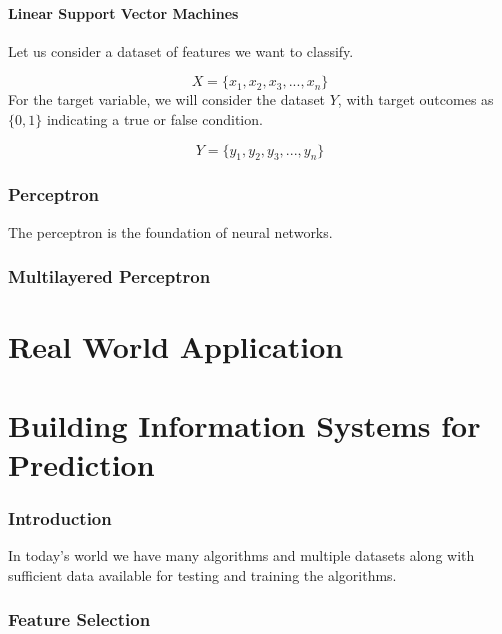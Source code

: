 \documentclass[12pt]{article}
\begin{document}
\subsection{Linear Support Vector Machines}
Let us consider a dataset of features we want to classify.

$$
X = \lbrace x_{1}, x_{2}, x_{3}, ... , x_{n} \rbrace 
$$ For the target variable, we will consider the dataset $Y$, with target outcomes as $\lbrace0,1\rbrace$ indicating a true or false condition.

$$
Y = \lbrace y_{1}, y_{2}, y_{3}, ... , y_{n} \rbrace 
$$

\newpage
\section{Perceptron}
The perceptron is the foundation of neural networks.

\newpage
\section{Multilayered Perceptron}

\newpage
\part{Real World Application}

\newpage
\part{Building Information Systems for Prediction}
\section{Introduction}
In today's world we have many algorithms and multiple datasets along with sufficient data available for testing and training the algorithms.



\section{Feature Selection}
\newpage
\end{document}
